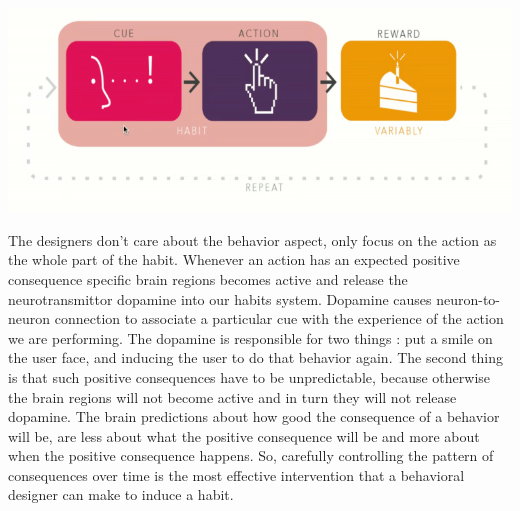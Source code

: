 \documentclass[11pt]{article}
\begin{document}
\begin{center}
\includegraphics[scale=0.4]{./images/CAR_model.png}
\end{center}

The designers don't care about the behavior aspect, only focus on the action as the whole part of the habit. Whenever an action has an expected positive consequence specific brain regions becomes active and release the neurotransmittor dopamine into our habits system. Dopamine causes neuron-to-neuron connection to associate a particular cue with the experience of the action we are performing. The dopamine is responsible for two things : put a smile on the user face, and inducing the user to do that behavior again. The second thing is that such positive consequences have to be unpredictable, because otherwise the brain regions will not become active and in turn they will not release dopamine. The brain predictions about how good the consequence of a behavior will be, are less about what the positive consequence will be and more about when the positive consequence happens. So, carefully controlling the pattern of consequences over time is the most effective intervention that a behavioral designer can make to induce a habit.
\end{document}
